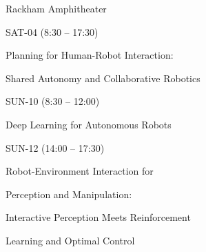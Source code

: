 \documentclass{article}
\begin{document}
\rssheader[2in]

\rssbig
\begin{center}
Rackham Amphitheater
\end{center}

\vfill

\rssmed
\begin{center}
SAT-04 (8:30 -- 17:30)
\end{center}

\rsssm
\begin{center}
Planning for Human-Robot Interaction: \par \noindent Shared Autonomy and
Collaborative Robotics
\end{center}

\vfill

\rssmed
\begin{center}
SUN-10 (8:30 -- 12:00)
\end{center}

\rsssm
\begin{center}
Deep Learning for Autonomous Robots
\end{center}

\vfill

\rssmed
\begin{center}
SUN-12 (14:00 -- 17:30)
\end{center}

\rsssm
\begin{center}
Robot-Environment Interaction for \par \noindent Perception and Manipulation:
\par \noindent Interactive Perception Meets Reinforcement \par Learning
\noindent and Optimal Control
\end{center}

\vfill
\end{document}
